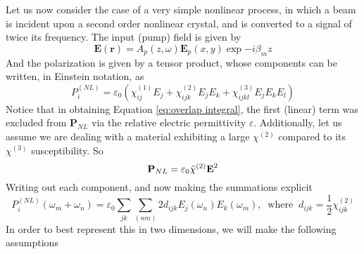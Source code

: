 Let us now consider the case of a very simple nonlinear process, in which a beam is incident upon a second order nonlinear crystal, and is converted to a signal of twice its frequency. The input (pump) field is given by
\begin{equation}
    \textbf{E}(\textbf{r})=A_p(z,\omega)\textbf{E}_p(x,y)\exp{-i\beta_m z}
    \label{eq:field}
\end{equation}
%
And the polarization is given by a tensor product, whose components can be written, in Einstein notation, as
\begin{equation}
    P^{(NL)}_i=\varepsilon_0\left(\chi^{(1)}_{ij}E_j+\chi^{(2)}_{ijk}E_jE_k+\chi^{(3)}_{ijkl}E_jE_kE_l\right)
\end{equation}
Notice that in obtaining Equation \ref{eq:overlap integral}, the first (linear) term was excluded from $\textbf{P}_{NL}$ via the relative electric permittivity $\varepsilon$. Additionally, let us assume we are dealing with a material exhibiting a large $\chi^{(2)}$ compared to its $\chi^{(3)}$ susceptibility. So
\begin{equation}
    \textbf{P}_{NL}=\varepsilon_0\Tilde{\chi}^{(2)}\textbf{E}^2
\end{equation}
Writing out each component, and now making the summations explicit
\begin{equation}
    P^{(NL)}_i(\omega_m+\omega_n)=\varepsilon_0\sum_{jk}\sum_{(nm)}2d_{ijk}E_j(\omega_n)E_k(\omega_m),\;\;\text{where}\;\;d_{ijk}=\frac{1}{2}\chi_{ijk}^{(2)}
\end{equation}
In order to best represent this in two dimensions, we will make the following assumptions
